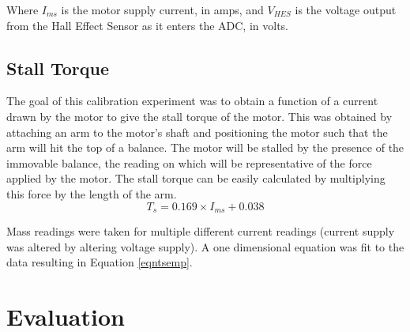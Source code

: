 \documentclass[twoside,a4]{report}
\begin{document}
	
	\noindent
	Where \(I_{ms}\) is the motor supply current, in amps, and \(V_{HES}\) is the voltage output from the Hall Effect Sensor as it enters the ADC, in volts.
	
	\subsection*{Stall Torque}
	The goal of this calibration experiment was to obtain a function of a current drawn by the motor to give the stall torque of the motor. This was obtained by attaching an arm to the motor's shaft and positioning the motor such that the arm will hit the top of a balance. The motor will be stalled by the presence of the immovable balance, the reading on which will be representative of the force applied by the motor. The stall torque can be easily calculated by multiplying this force by the length of the arm.
	\begin{equation}
		T_s = 0.169 \times I_{ms} + 0.038
		\label{eqntsemp}
	\end{equation}
	
	
	\noindent
	Mass readings were taken for multiple different current readings (current supply was altered by altering voltage supply). A one dimensional equation was fit to the data resulting in Equation \ref{eqntsemp}.

	\section{Evaluation} %
	
\end{document}
